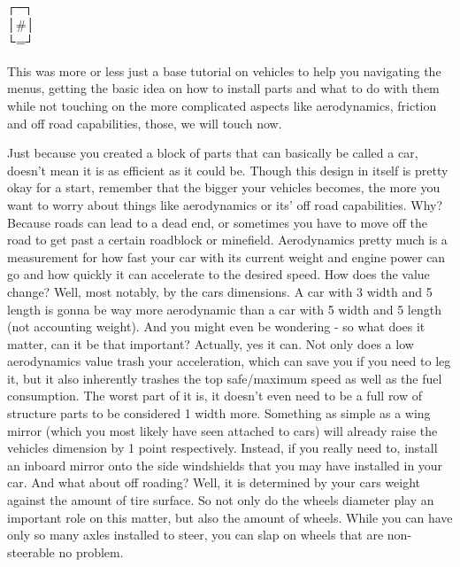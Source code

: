 \documentclass[11pt]{report}
\begin{document}
\vspace{0.5\baselineskip}
\begin{spacing}{0.75}
┌─┐\\
│\#│\\
└=┘
\end{spacing}
\vspace{0.5\baselineskip}


This was more or less just a base tutorial on vehicles to help you navigating the menus, getting the basic idea on how to install parts and what to do with them while not touching on the more complicated aspects like aerodynamics, friction and off road capabilities, those, we will touch now.

Just because you created a block of parts that can basically be called a car, doesn't mean it is as efficient as it could be. Though this design in itself is pretty okay for a start, remember that the bigger your vehicles becomes, the more you want to worry about things like aerodynamics or its' off road capabilities. Why? Because roads can lead to a dead end, or sometimes you have to move off the road to get past a certain roadblock or minefield. Aerodynamics pretty much is a measurement for how fast your car with its current weight and engine power can go and how quickly it can accelerate to the desired speed. How does the value change? Well, most notably, by the cars dimensions. A car with 3 width and 5 length is gonna be way more aerodynamic than a car with 5 width and 5 length (not accounting weight). And you might even be wondering - so what does it matter, can it be that important? Actually, yes it can. Not only does a low aerodynamics value trash your acceleration, which can save you if you need to leg it, but it also inherently trashes the top safe/maximum speed as well as the fuel consumption. The worst part of it is, it doesn't even need to be a full row of structure parts to be considered 1 width more. Something as simple as a wing mirror (which you most likely have seen attached to cars) will already raise the vehicles dimension by 1 point respectively. Instead, if you really need to, install an inboard mirror onto the side windshields that you may have installed in your car. And what about off roading? Well, it is determined by your cars weight against the amount of tire surface. So not only do the wheels diameter play an important role on this matter, but also the amount of wheels. While you can have only so many axles installed to steer, you can slap on wheels that are non-steerable no problem.
\end{document}
